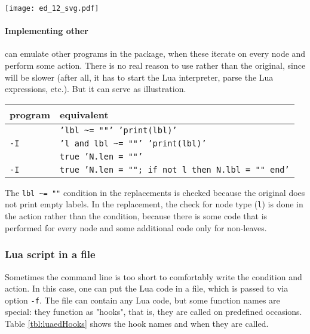 
\begin{center}
\texttt{[image: ed\_12\_svg.pdf]}
\end{center}

\begin{samepage}
\paragraph{Implementing other \nutils}

\noindent{}\luaed{} can emulate other programs in the package, when these
iterate on every node and perform some action. There is no real reason to use
\luaed{} rather than the original, since \luaed{} will be slower (after all, it
has to start the Lua interpreter, parse the Lua expressions, etc.). But it
can serve as illustration.
\end{samepage}

\begin{center}
\begin{tabular}{ll}
program & \luaed{} equivalent \\
\hline
{}{} 						& {\tt 'lbl \~{}= ""' 'print(lbl)'}  \\
{} {\tt -I} 		& {\tt 'l and lbl \~{}= ""' 'print(lbl)'} \\
\topology{}						& {\tt true 'N.len = ""'} \\
\topology{} {\tt -I} 	& {\tt true 'N.len = ""; if not l then N.lbl = "" end'}
\end{tabular}
\end{center}

The {\tt lbl \~{}= ""} condition in the  replacements is checked
because the original  does not print empty labels. In the \topology{}
replacement, the check for node type (\texttt{l}) is done in the action rather
than the condition, because there is some code that is performed for every node
and some additional code only for non-leaves. 

\subsubsection{Lua script in a file}
\label{sct:lua_file_input}

Sometimes the command line is too short to comfortably write the condition and
action. In this case, one can put the Lua code in a file, which is passed to
\luaed{} via option \texttt{-f}. The file can contain any Lua code, but some
function names are special: they function as "hooks", that is, they are called
on predefined occasions. Table \ref{tbl:luaedHooks} shows the hook names and
when they are called.

